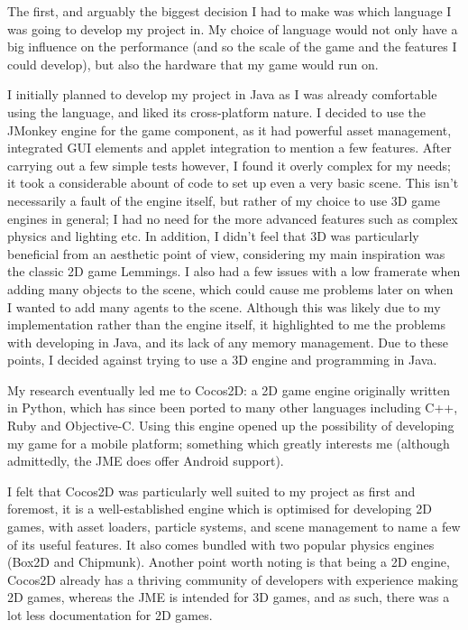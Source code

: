\documentclass[a4paper,oneside]{report}
\begin{document}
The first, and arguably the biggest decision I had to make was which language I was going to develop my project in. My choice of language would not only have a big influence on the performance (and so the scale of the game and the features I could develop), but also the hardware that my game would run on.  

I initially planned to develop my project in Java as I was already comfortable using the language, and liked its cross-platform nature. I decided to use the JMonkey engine for the game component, as it had powerful asset management, integrated GUI elements and applet integration to mention a few features. After carrying out a few simple tests however, I found it overly complex for my needs; it took a considerable abount of code to set up even a very basic scene. This isn't necessarily a fault of the engine itself, but rather of my choice to use 3D game engines in general; I had no need for the more advanced features such as complex physics and lighting etc. In addition, I didn't feel that 3D was particularly beneficial from an aesthetic point of view, considering my main inspiration was the classic 2D game Lemmings. I also had a few issues with a low framerate when adding many objects to the scene, which could cause me problems later on when I wanted to add many agents to the scene. Although this was likely due to my implementation rather than the engine itself, it highlighted to me the problems with developing in Java, and its lack of any memory management. Due to these points, I decided against trying to use a 3D engine and programming in Java.

My research eventually led me to Cocos2D: a 2D game engine originally written in Python, which has since been ported to many other languages including C++, Ruby and Objective-C. Using this engine opened up the possibility of developing my game for a mobile platform; something which greatly interests me (although admittedly, the JME does offer Android support).

I felt that Cocos2D was particularly well suited to my project as first and foremost, it is a well-established engine which is optimised for developing 2D games, with asset loaders, particle systems, and scene management to name a few of its useful features. It also comes bundled with two popular physics engines (Box2D and Chipmunk). Another point worth noting is that being a 2D engine, Cocos2D already has a thriving community of developers with experience making 2D games, whereas the JME is intended for 3D games, and as such, there was a lot less documentation for 2D games. 
\end{document}
